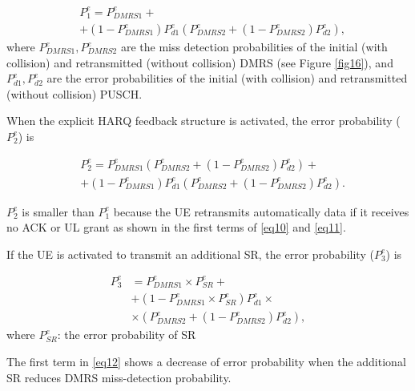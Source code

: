 \documentclass{ieeeaccess}
\begin{document}
\begin{equation}
\begin{split}
 &P^{e}_{1} = P^{e}_{DMRS1} + \\
        &+ (1-P^{e}_{DMRS1})P^{e}_{d1}(P^{e}_{DMRS2} + (1-P^{e}_{DMRS2})P^{e}_{d2}),\label{eq10}   
\end{split}
\end{equation}
where $ P^{e}_{DMRS1}, P^{e}_{DMRS2}$ are the miss detection probabilities of the initial (with collision) and retransmitted (without collision) DMRS (see Figure \ref{fig16}), and $P^{e}_{d1}, P^{e}_{d2}$ are the error probabilities of the initial (with collision) and retransmitted (without collision) PUSCH.


When the explicit HARQ feedback structure is activated, the error probability ($ P^{e}_{2}$)  is 

\begin{equation}
\begin{split}
 &P^{e}_{2} = P^{e}_{DMRS1}(P^{e}_{DMRS2} + (1-P^{e}_{DMRS2})P^{e}_{d2}) + \\
        &+ (1-P^{e}_{DMRS1})P^{e}_{d1}(P^{e}_{DMRS2} + (1-P^{e}_{DMRS2})P^{e}_{d2}).\label{eq11}   
\end{split}
\end{equation}

$ P^{e}_{2}$ is smaller than $ P^{e}_{1}$ because the UE retransmits automatically data if it receives no ACK or UL grant as shown in the first terms of \eqref{eq10} and \eqref{eq11}. 

If the UE is activated to transmit an additional SR, the error probability ($ P^{e}_{3}$) is 

\begin{equation}
\begin{split}
 P^{e}_{3} &= P^{e}_{DMRS1}\times P^{e}_{SR} + \\
        &+ (1-P^{e}_{DMRS1}\times P^{e}_{SR})P^{e}_{d1}\times\\
        &\times(P^{e}_{DMRS2} + (1-P^{e}_{DMRS2})P^{e}_{d2}),\label{eq12}   
\end{split}
\end{equation}
where $P^{e}_{SR}$: the error probability of SR

The first term in \eqref{eq12} shows a decrease of error probability when the additional SR reduces DMRS miss-detection probability.
\end{document}
